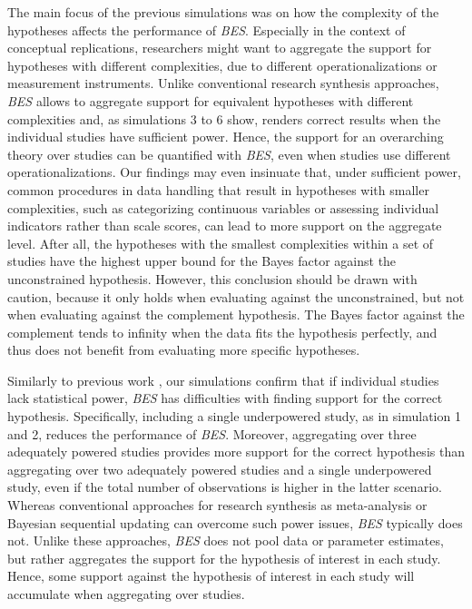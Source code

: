 \documentclass[
  authoryear,
  preprint,
  5p,
  twocolumn]{elsarticle}
\begin{document}
The main focus of the previous simulations was on how the complexity of
the hypotheses affects the performance of \emph{BES}. Especially in the
context of conceptual replications, researchers might want to aggregate
the support for hypotheses with different complexities, due to different
operationalizations or measurement instruments. Unlike conventional
research synthesis approaches, \emph{BES} allows to aggregate support
for equivalent hypotheses with different complexities and, as
simulations 3 to 6 show, renders correct results when the individual
studies have sufficient power. Hence, the support for an overarching
theory over studies can be quantified with \emph{BES}, even when studies
use different operationalizations. Our findings may even insinuate that,
under sufficient power, common procedures in data handling that result
in hypotheses with smaller complexities, such as categorizing continuous
variables or assessing individual indicators rather than scale scores,
can lead to more support on the aggregate level. After all, the
hypotheses with the smallest complexities within a set of studies have
the highest upper bound for the Bayes factor against the unconstrained
hypothesis. However, this conclusion should be drawn with caution,
because it only holds when evaluating against the unconstrained, but not
when evaluating against the complement hypothesis. The Bayes factor
against the complement tends to infinity when the data fits the
hypothesis perfectly, and thus does not benefit from evaluating more
specific hypotheses.

Similarly to previous work \citep[e.g.,][]{klugkist_volker}, our
simulations confirm that if individual studies lack statistical power,
\emph{BES} has difficulties with finding support for the correct
hypothesis. Specifically, including a single underpowered study, as in
simulation 1 and 2, reduces the performance of \emph{BES}. Moreover,
aggregating over three adequately powered studies provides more support
for the correct hypothesis than aggregating over two adequately powered
studies and a single underpowered study, even if the total number of
observations is higher in the latter scenario. Whereas conventional
approaches for research synthesis as meta-analysis or Bayesian
sequential updating can overcome such power issues, \emph{BES} typically
does not. Unlike these approaches, \emph{BES} does not pool data or
parameter estimates, but rather aggregates the support for the
hypothesis of interest in each study. Hence, some support against the
hypothesis of interest in each study will accumulate when aggregating
over studies.
\end{document}
